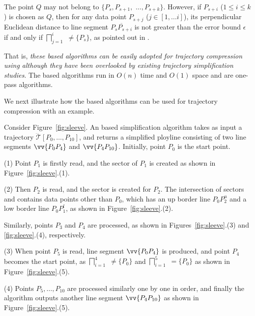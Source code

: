 The point $Q$ may not belong to $\{P_{s}, P_{s+1},$ $\ldots, P_{s+k}\}$.
However, if $P_{s+i}$ ($1\le i\le k$) is chosen as $Q$, then
for any data point $P_{s+j}$ ($j \in [1, ... i]$), its perpendicular Euclidean distance to
line segment $\overline{P_sP_{s+i}}$ is not greater than the error bound $\epsilon$ if and only if $\bigsqcap_{j=1}^{i}$ $\ne \{P_s\}$, as pointed out in \cite{Zhao:Sleeve}.

That is, {\em these \cia based algorithms can be easily adopted for trajectory compression using \ped although they have been overlooked by existing trajectory simplification studies}.
The \cia based algorithms run in $O(n)$ time and $O(1)$ space and are one-pass algorithms.

We next illustrate how the \cia based algorithms can be used for trajectory compression with an example.

\begin{example}
\label{exm-alg-sleeve}
Consider Figure~\ref{fig:sleeve}. An \cia based simplification algorithm takes as input a trajectory $\dddot{\mathcal{T}}[P_0, \ldots, P_{10}]$, and returns a simplified ployline consisting of two line segments $\vv{P_0P_4}$ and  $\vv{P_4P_{10}}$. Initially, point $P_0$ is the start point.

\sstab(1) Point $P_1$ is firstly read, and the sector  of $P_1$ is created as shown in Figure~\ref{fig:sleeve}.(1).

\sstab(2) Then $P_2$ is read, and the sector   is created for $P_2$. The intersection of sectors  and   contains data points other than $P_0$,  which has an up border line $P_0P_2^u$ and a low border line $P_0P_1^l$, as shown in Figure~\ref{fig:sleeve}.(2).

Similarly, points $P_3$ and $P_4$ are processed, as shown in Figures~\ref{fig:sleeve}.(3) and \ref{fig:sleeve}.(4), respectively.

\sstab(3) When point $P_5$ is read,  line segment $\vv{P_0P_4}$ is produced, and point $P_4$ becomes the start point, as $\bigsqcap_{i=1}^{4}$ $\ne\{P_0\}$ and $\bigsqcap_{i=1}^{5}$ $=\{P_0\}$ as shown in Figure~\ref{fig:sleeve}.(5).


\sstab(4) Points $P_5, \ldots, P_{10}$ are processed similarly one by one in order, and finally the algorithm outputs another line segment $\vv{P_4P_{10}}$ as shown in Figure~\ref{fig:sleeve}.(5). \eop
\end{example}


